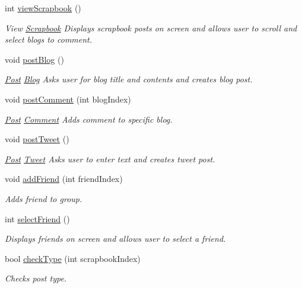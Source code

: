 \begin{DoxyCompactItemize}
int \hyperlink{classGroupScrapbookUI_ae9d46046637ad95dcc5cff4dd0a1cb37}{view\+Scrapbook} ()
\begin{DoxyCompactList}\small\item\em View \hyperlink{classScrapbook}{Scrapbook} Displays scrapbook posts on screen and allows user to scroll and select blogs to comment. \end{DoxyCompactList}\item 
void \hyperlink{classGroupScrapbookUI_ab9b96dbb884e49aa9a2146784340b0bf}{post\+Blog} ()\hypertarget{classGroupScrapbookUI_ab9b96dbb884e49aa9a2146784340b0bf}{}\label{classGroupScrapbookUI_ab9b96dbb884e49aa9a2146784340b0bf}

\begin{DoxyCompactList}\small\item\em \hyperlink{classPost}{Post} \hyperlink{classBlog}{Blog} Asks user for blog title and contents and creates blog post. \end{DoxyCompactList}\item 
void \hyperlink{classGroupScrapbookUI_a825bff1239eb5ee8062f0c3057e09af0}{post\+Comment} (int blog\+Index)
\begin{DoxyCompactList}\small\item\em \hyperlink{classPost}{Post} \hyperlink{classComment}{Comment} Adds comment to specific blog. \end{DoxyCompactList}\item 
void \hyperlink{classGroupScrapbookUI_a81992e0811cd86d11b9718e11b64db52}{post\+Tweet} ()\hypertarget{classGroupScrapbookUI_a81992e0811cd86d11b9718e11b64db52}{}\label{classGroupScrapbookUI_a81992e0811cd86d11b9718e11b64db52}

\begin{DoxyCompactList}\small\item\em \hyperlink{classPost}{Post} \hyperlink{classTweet}{Tweet} Asks user to enter text and creates tweet post. \end{DoxyCompactList}\item 
void \hyperlink{classGroupScrapbookUI_a389dda951ced6d3384cdb15bffb5e530}{add\+Friend} (int friend\+Index)
\begin{DoxyCompactList}\small\item\em Adds friend to group. \end{DoxyCompactList}\item 
int \hyperlink{classGroupScrapbookUI_a5f7c9c1a9ba8e3c4bcdac89762eca4a3}{select\+Friend} ()
\begin{DoxyCompactList}\small\item\em Displays friends on screen and allows user to select a friend. \end{DoxyCompactList}\item 
bool \hyperlink{classGroupScrapbookUI_a237840b9944b0589aa8d218fb03de420}{check\+Type} (int scrapbook\+Index)
\begin{DoxyCompactList}\small\item\em Checks post type. \end{DoxyCompactList}\end{DoxyCompactItemize}
